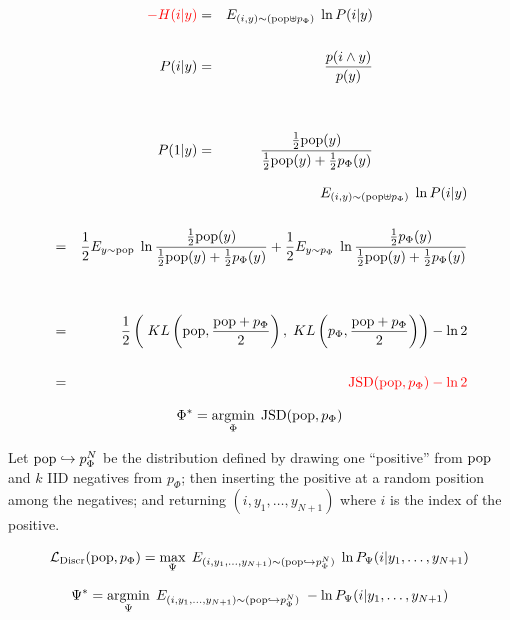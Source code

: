 {\begin{eqnarray*}
{\color{red} - H(i|y)} & = & E_{(i,y) \sim (\mathrm{pop}\uplus p_\Phi)}\; \ln P(i|y) \\
\\
P(i|y) & = & \frac{p(i \wedge y)}{p(y)} \\
\\
\\
P(1|y) & = & \frac{\frac{1}{2}\mathrm{pop}(y)}{\frac{1}{2}\mathrm{pop}(y) + \frac{1}{2}p_\Phi(y)}
\end{eqnarray*}


\begin{eqnarray*}
& & E_{(i,y) \sim (\mathrm{pop}\uplus p_\Phi)}\;\ln P(i|y) \\
\\
& = & \frac{1}{2} E_{y \sim \mathrm{pop}}\; \ln \frac{\frac{1}{2}\mathrm{pop}(y)}{\frac{1}{2}\mathrm{pop}(y) + \frac{1}{2} p_\Phi(y)} + \frac{1}{2} E_{y \sim p_\Phi}\;\ln \frac{\frac{1}{2}p_\Phi(y)}{\frac{1}{2}\mathrm{pop}(y) + \frac{1}{2}p_\Phi(y)} \\
\\
\\
& = & \frac{1}{2} \left(\;KL\left(\mathrm{pop},\frac{\mathrm{pop}+p_\Phi}{2}\right),\;KL\left(p_\Phi,\frac{\mathrm{pop}+p_\Phi}{2}\right)\right) - \ln 2 \\
\\
& = & {\color{red} \mathrm{JSD}(\mathrm{pop},p_\Phi) - \ln 2}
\end{eqnarray*}


{\color{red} $$\Phi^* = \operatorname*{argmin}_\Phi\;\mathrm{JSD}(\mathrm{pop},p_\Phi)$$}


Let {\color{red} $\mathrm{pop}\hookrightarrow p_\Phi^N$} be the distribution defined by drawing one ``positive'' from $\mathrm{pop}$ and $k$ IID negatives from $p_\Phi$;
then inserting the positive at a random position among the negatives; and returning $(i,y_1,\ldots,y_{N+1})$ where
$i$ is the index of the positive.

{\color{red} $${\cal L}_{\mathrm{Discr}}(\mathrm{pop},p_\Phi)  = \max_\Psi\; E_{(i,y_1,\ldots,y_{N+1})\sim (\mathrm{pop}\hookrightarrow p_\Phi^N)} \; \ln P_\Psi(i|y_1,\ldots,y_{N+1})$$}


{\color{red} $$\Psi^* = \operatorname*{argmin}_\Psi\; E_{(i,y_1,\ldots,y_{N+1})\sim (\mathrm{pop}\hookrightarrow p_\Phi^N)} \;- \ln P_\Psi(i|y_1,\ldots,y_{N+1})$$}

}
